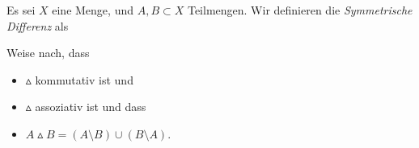 \begin{exercise}
  Es sei $X$ eine Menge, und $A,B \subset X$ Teilmengen. Wir definieren die
  \emph{Symmetrische Differenz} als
  \begin{center}
  \end{center}
  Weise nach, dass
  \begin{itemize}
  \item $\vartriangle$ kommutativ ist und
  \item $\vartriangle$ assoziativ ist und dass
  \item $A\vartriangle B = (A\setminus B)\cup (B\setminus A)$.
  \end{itemize}
\end{exercise}
